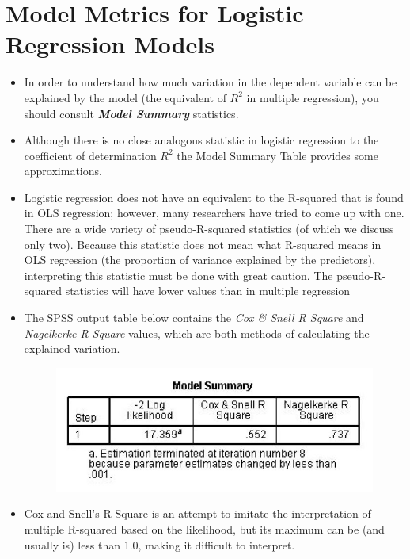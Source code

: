 \documentclass[a4paper,12pt]{article}
\begin{document}
\section*{Model Metrics for Logistic Regression Models}
\begin{itemize}

\item In order to understand how much variation in the dependent variable can be explained 
by the model (the equivalent of $R^2$ in multiple regression), you should consult \textbf{\textit{Model Summary}} statistics.

\item Although there is no close analogous statistic in logistic regression to the coefficient of
determination $R^2$ the Model Summary Table provides some approximations.
\item 
Logistic regression does not have an equivalent to the R-squared that is found in OLS regression; however, many researchers have tried to come up with one. There are a wide variety of pseudo-R-squared statistics (of which we discuss only two).  Because this statistic does not mean what R-squared means in OLS regression (the proportion of variance explained by the predictors), interpreting this statistic must be done with great caution.
The pseudo-R-squared statistics will have lower values than in multiple regression


\item The SPSS output table below contains the \textit{Cox \& Snell R Square} and \textit{Nagelkerke R Square } values, which are both methods of calculating the explained variation.



\begin{figure}[h!]
	\centering
	\includegraphics[width=0.9\linewidth]{images/Logistic5a}
\end{figure}



\item Cox and Snell’s R-Square is an attempt to imitate the interpretation of multiple R-squared based
on the likelihood, but its maximum can be (and usually is) less than 1.0, making it difficult to
interpret. 


\end{itemize}
\end{document}
